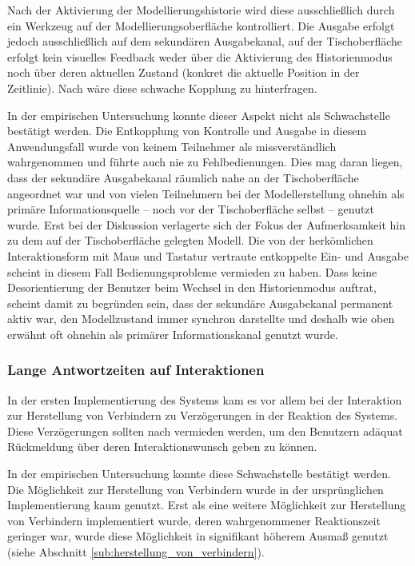 Nach der Aktivierung der Modellierungshistorie wird diese ausschließlich durch ein Werkzeug auf der Modellierungsoberfläche kontrolliert. Die Ausgabe erfolgt jedoch ausschließlich auf dem sekundären Ausgabekanal, auf der Tischoberfläche erfolgt kein visuelles Feedback weder über die Aktivierung des Historienmodus noch über deren aktuellen Zustand (konkret die aktuelle Position in der Zeitlinie). Nach \citet{Ullmer00} wäre diese schwache Kopplung zu hinterfragen.

In der empirischen Untersuchung konnte dieser Aspekt nicht als Schwachstelle bestätigt werden. Die Entkopplung von Kontrolle und Ausgabe in diesem Anwendungsfall wurde von keinem Teilnehmer als missverständlich wahrgenommen und führte auch nie zu Fehlbedienungen. Dies mag daran liegen, dass der sekundäre Ausgabekanal räumlich nahe an der Tischoberfläche angeordnet war und von vielen Teilnehmern bei der Modellerstellung ohnehin als primäre Informationsquelle -- noch vor der Tischoberfläche selbst -- genutzt wurde. Erst bei der Diskussion verlagerte sich der Fokus der Aufmerksamkeit hin zu dem auf der Tischoberfläche gelegten Modell. Die von der herkömlichen Interaktionsform mit Maus und Tastatur vertraute entkoppelte Ein- und Ausgabe scheint in diesem Fall Bedienungsprobleme vermieden zu haben. Dass keine Desorientierung der Benutzer beim Wechsel in den Historienmodus auftrat, scheint damit zu begründen sein, dass der sekundäre Ausgabekanal permanent aktiv war, den Modellzustand immer synchron darstellte und deshalb wie oben erwähnt oft ohnehin als primärer Informationskanal genutzt wurde.  

\subsubsection{Lange Antwortzeiten auf Interaktionen}

In der ersten Implementierung des Systems kam es vor allem bei der Interaktion zur Herstellung von Verbindern zu Verzögerungen in der Reaktion des Systems. Diese Verzögerungen sollten nach \citet{Bellotti02} vermieden werden, um den Benutzern adäquat Rückmeldung über deren Interaktionswunsch geben zu können.

In der empirischen Untersuchung konnte diese Schwachstelle bestätigt werden. Die Möglichkeit zur Herstellung von Verbindern wurde in der ursprünglichen Implementierung kaum genutzt. Erst als eine weitere Möglichkeit zur Herstellung von Verbindern implementiert wurde, deren wahrgenommener Reaktionszeit geringer war, wurde diese Möglichkeit in signifikant höherem Ausmaß genutzt (siehe Abschnitt \ref{sub:herstellung_von_verbindern}).

